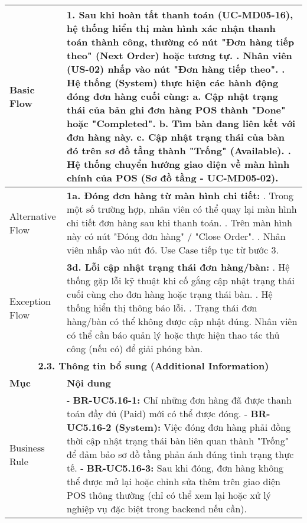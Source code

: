 \begin{longtable}{|m{4cm}|p{11cm}|}
\hline
Basic Flow & 1. Sau khi hoàn tất thanh toán (UC-MD05-16), hệ thống hiển thị màn hình xác nhận thanh toán thành công, thường có nút "Đơn hàng tiếp theo" (Next Order) hoặc tương tự. \newline 2. Nhân viên (US-02) nhấp vào nút "Đơn hàng tiếp theo". \newline 3. Hệ thống (System) thực hiện các hành động đóng đơn hàng cuối cùng: \newline    a. Cập nhật trạng thái của bản ghi đơn hàng POS thành "Done" hoặc "Completed". \newline    b. Tìm bàn đang liên kết với đơn hàng này. \newline    c. Cập nhật trạng thái của bàn đó trên sơ đồ tầng thành "Trống" (Available). \newline 4. Hệ thống chuyển hướng giao diện về màn hình chính của POS (Sơ đồ tầng - UC-MD05-02). \\
\hline
Alternative Flow & \textbf{1a. Đóng đơn hàng từ màn hình chi tiết:} \newline    1. Trong một số trường hợp, nhân viên có thể quay lại màn hình chi tiết đơn hàng sau khi thanh toán. \newline    2. Trên màn hình này có nút "Đóng đơn hàng" / "Close Order". \newline    3. Nhân viên nhấp vào nút đó. Use Case tiếp tục từ bước 3. \\
\hline
Exception Flow & \textbf{3d. Lỗi cập nhật trạng thái đơn hàng/bàn:} \newline    1. Hệ thống gặp lỗi kỹ thuật khi cố gắng cập nhật trạng thái cuối cùng cho đơn hàng hoặc trạng thái bàn. \newline    2. Hệ thống hiển thị thông báo lỗi. \newline    3. Trạng thái đơn hàng/bàn có thể không được cập nhật đúng. Nhân viên có thể cần báo quản lý hoặc thực hiện thao tác thủ công (nếu có) để giải phóng bàn. \\
\hline
\multicolumn{2}{|c|}{\textbf{2.3. Thông tin bổ sung (Additional Information)}} \\
\hline
\textbf{Mục} & \textbf{Nội dung} \\
\hline
Business Rule & - \textbf{BR-UC5.16-1:} Chỉ những đơn hàng đã được thanh toán đầy đủ (Paid) mới có thể được đóng. \newline - \textbf{BR-UC5.16-2 (System):} Việc đóng đơn hàng phải đồng thời cập nhật trạng thái bàn liên quan thành "Trống" để đảm bảo sơ đồ tầng phản ánh đúng tình trạng thực tế. \newline - \textbf{BR-UC5.16-3:} Sau khi đóng, đơn hàng không thể được mở lại hoặc chỉnh sửa thêm trên giao diện POS thông thường (chỉ có thể xem lại hoặc xử lý nghiệp vụ đặc biệt trong backend nếu cần). \\

\end{longtable}
